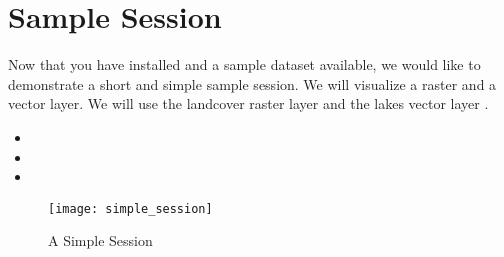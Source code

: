 \section{Sample Session}\label{samplesession}

Now that you have \qg installed and a sample dataset available, we would 
like to demonstrate a short and simple \qg sample session. We will visualize 
a raster and a vector layer. We will use the landcover raster 
layer  and the lakes 
vector layer .


\begin{itemize}[label=--]
\item {}
\item {}
\item {}
\end{itemize} 

\begin{figure}[ht]
   \centering 
   \texttt{[image: simple\_session]}
   \caption{A Simple \qg Session \nixcaption}\label{fig:simple_session}
\end{figure}


